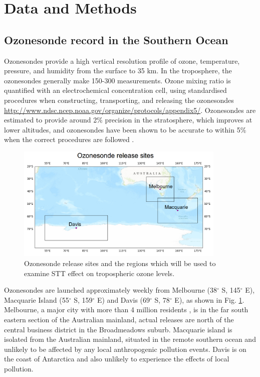 \documentclass[acp, manuscript]{copernicus} %
\begin{document}
%
\section{Data and Methods}

  \subsection{Ozonesonde record in the Southern Ocean}
  \label{sec:ozonesondes}
    Ozonesondes provide a high vertical resolution profile of ozone, temperature, pressure, and humidity from the surface to 35 km.
    In the troposphere, the ozonesondes generally make 150-300 measurements.    
    Ozone mixing ratio is quantified with an electrochemical concentration cell, using standardised procedures when constructing, transporting, and releasing the ozonesondes \url{http://www.ndsc.ncep.noaa.gov/organize/protocols/appendix5/}.
    Ozonesondes are estimated to provide around 2\% precision in the stratosphere, which improves at lower altitudes, and ozonesondes have been shown to be accurate to within 5\% when the correct procedures are followed \citep{Smit2007}.
    
    \begin{figure}
      \includegraphics[width=10cm]{figures/ComparisonRegions.png}
      \caption{Ozonesonde release sites and the regions which will be used to examine STT effect on tropospheric ozone levels.}
      \label{fig:ComparisonRegion}
    \end{figure}
    
    Ozonesondes are launched approximately weekly from Melbourne (38$^{\circ}$ S, 145$^{\circ}$ E), Macquarie Island (55$^{\circ}$ S, 159$^{\circ}$ E) and Davis (69$^{\circ}$ S, 78$^{\circ}$ E), as shown in Fig. \ref{fig:ComparisonRegion}. 
    Melbourne, a major city with more than 4 million residents \citep{ABS2016}, is in the far south eastern section of the Australian mainland, actual releases are north of the central business district in the Broadmeadows suburb.
    Macquarie island is isolated from the Australian mainland, situated in the remote southern ocean and unlikely to be affected by any local anthropogenic pollution events.
    Davis is on the coast of Antarctica and also unlikely to experience the effects of local pollution.
    
\end{document}
